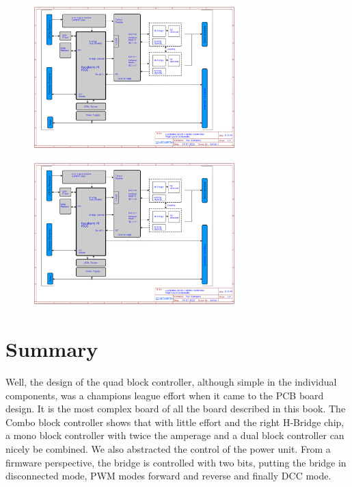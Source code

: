 \begin{figure}[htbp]
    \centering
    \includegraphics[page=6, width=0.7\textwidth]{./Schematics/Schematic_LcsNodes-Block-Combo-Controller.pdf}
\end{figure}
\FloatBarrier

\begin{figure}[htbp]
    \centering
    \includegraphics[page=7, width=0.7\textwidth]{./Schematics/Schematic_LcsNodes-Block-Combo-Controller.pdf}
\end{figure}
\FloatBarrier

\section{Summary}

Well, the design of the quad block controller, although simple in the individual components, was a champions league effort when it came to the PCB board design. It is the most complex board of all the board described in this book. The Combo block controller shows that with little effort and the right H-Bridge chip, a mono block controller with twice the amperage and a dual block controller can nicely be combined. We also abstracted the control of the power unit. From a firmware perspective, the bridge is controlled with two bits, putting the bridge in disconnected mode, PWM modes forward and reverse and finally DCC mode.

